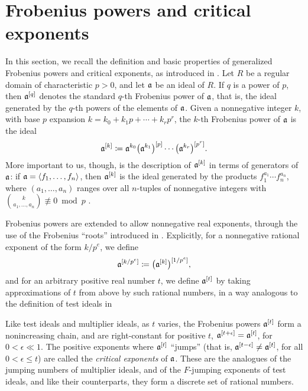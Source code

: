 \documentclass[11pt]{amsart}
\begin{document}
\newpage

\section{Frobenius powers and critical exponents}

In this section, we recall the definition and basic properties of generalized Frobenius powers and critical exponents, as introduced in \cite{hernandez+etal.frobenius_powers}.
Let $R$ be a regular domain of characteristic $p > 0$, and let $\mathfrak{a}$ be an ideal of $R$.
If $q$ is a power of $p$, then $\mathfrak{a}^{[q]}$ denotes the standard $q$-th Frobenius power of $\mathfrak{a}$, that is, the ideal generated by the $q$-th powers of the elements of $\mathfrak{a}$.
Given a nonnegative integer $k$, with base $p$ expansion $k = k_0 + k_1 p + \cdots + k_r p^r$, the $k$-th Frobenius power of $\mathfrak{a}$ is the ideal
\[\mathfrak{a}^{[k]} \coloneqq \mathfrak{a}^{k_0}\big(\mathfrak{a}^{k_1}\big)^{[p]}\cdots \big(\mathfrak{a}^{k_r}\big)^{[p^r]}.\]
More important to us, though, is the description of $\mathfrak{a}^{[k]}$ in terms of generators of $\mathfrak{a}$: if $\mathfrak{a} = \langle f_1,\ldots,f_n \rangle$, then $\mathfrak{a}^{[k]}$ is the ideal generated by the products $f_1^{a_1}\cdots f_n^{a_n}$, where $(a_1,\ldots,a_n)$ ranges over all $n$-tuples of nonnegative integers with $\binom{k}{a_1,\ldots,a_n}\not\equiv 0\bmod{p}$ \cite[Proposition~3.5]{hernandez+etal.frobenius_powers}.

Frobenius powers are extended to allow nonnegative real exponents, through the use of the Frobenius ``roots'' introduced in \cite{blickle+mustata+smith.discr_rat_FPTs}.
Explicitly, for a nonnegative rational exponent of the form $k/p^e$, we define
\[\mathfrak{a}^{[k/p^e]} \coloneqq \big(\mathfrak{a}^{[k]}\big)^{[1/p^e]},\]
and for an arbitrary positive real number $t$, we define $\mathfrak{a}^{[t]}$ by taking approximations of $t$ from above by such rational numbers, in a way analogous to the definition of test ideals in \loccit
{}

Like test ideals and multiplier ideals, as $t$ varies, the Frobenius powers $\mathfrak{a}^{[t]}$ form a nonincreasing chain, and are right-constant for positive $t$, \ie $\mathfrak{a}^{[t+\epsilon]} = \mathfrak{a}^{[t]}$, for $0<\epsilon \ll 1$.
The positive exponents where $\mathfrak{a}^{[t]}$ ``jumps'' (that is, $\mathfrak{a}^{[t-\epsilon]}\ne \mathfrak{a}^{[t]}$, for all $0<\epsilon \le t$) are called the \emph{critical exponents} of $\mathfrak{a}$.
These are the analogues of the jumping numbers of multiplier ideals, and of the $F$-jumping exponents of test ideals, and like their counterparts, they form a discrete set of rational numbers.
\end{document}

